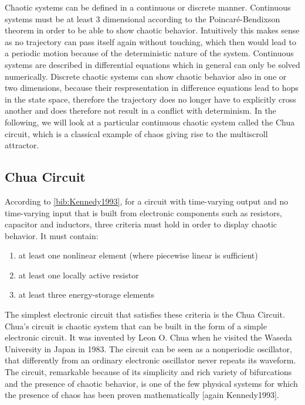 \documentclass[main]{subfiles}
\begin{document}
Chaotic systems can be defined in a continuous or discrete manner. Continuous systems must be at least 3 dimensional according to the Poincaré-Bendixson theorem in order to be able to show chaotic behavior. Intuitively this makes sense as no trajectory can pass itself again without touching, which then would lead to a periodic motion because of the deterministic nature of the system. Continuous systems are described in differential equations which in general can only be solved numerically. Discrete chaotic systems can show chaotic behavior also in one or two dimensions, because their respresentation in difference equations lead to hops in the state space, therefore the trajectory does no longer have to explicitly cross another and does therefore not result in a conflict with determinism. In the following, we will look at a particular continuous chaotic system called the Chua circuit, which is a classical example of chaos giving rise to the multiscroll attractor.

\subsection{Chua Circuit}
\label{subsec:chua-circuit}

According to \ref{bib:Kennedy1993}, for a circuit with time-varying output and no time-varying input that is built from electronic components such as resistors, capacitor and inductors, three criteria must hold in order to display chaotic behavior. It must contain:
  \begin{enumerate}
  \item at least one nonlinear element (where piecewise linear is sufficient)
  \item at least one locally active resistor
  \item at least three energy-storage elements
  \end{enumerate}
  
The simplest electronic circuit that satisfies these criteria is the Chua Circuit. Chua's circuit is chaotic system that can be built in the form of a simple electronic circuit. It was invented by Leon O. Chua when he visited the Waseda University in Japan in 1983. The circuit can be seen as a nonperiodic oscillator, that differently from an ordinary electronic oscillator never repeats its waveform. The circuit, remarkable because of its simplicity and rich variety of bifurcations and the presence of chaotic behavior, is one of the few physical systems for which the presence of chaos has been proven mathematically [again Kennedy1993].
\end{document}
